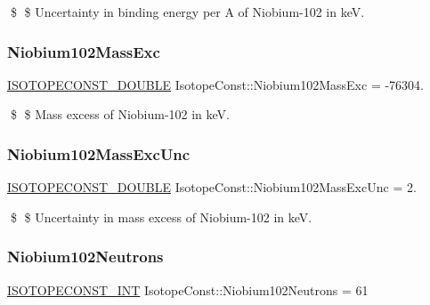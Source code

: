 \$ \$ Uncertainty in binding energy per A of Niobium-\/102 in keV. \mbox{\label{group___isotope_const-_niobium-_nb102_ga634a663657324eded202df357acde7ba}} 
\subsubsection{\texorpdfstring{Niobium102\+Mass\+Exc}{Niobium102MassExc}}
{\footnotesize\ttfamily \mbox{\hyperlink{group___isotope_const-_macros_ga8f45a7272ce02c0b4c65c44636ed719a}{I\+S\+O\+T\+O\+P\+E\+C\+O\+N\+S\+T\+\_\+\+D\+O\+U\+B\+LE}} Isotope\+Const\+::\+Niobium102\+Mass\+Exc = -\/76304.}

\$ \$ Mass excess of Niobium-\/102 in keV. \mbox{\label{group___isotope_const-_niobium-_nb102_ga6ea0af7cfe1a93e3fdfdc2a989186f41}} 
\subsubsection{\texorpdfstring{Niobium102\+Mass\+Exc\+Unc}{Niobium102MassExcUnc}}
{\footnotesize\ttfamily \mbox{\hyperlink{group___isotope_const-_macros_ga8f45a7272ce02c0b4c65c44636ed719a}{I\+S\+O\+T\+O\+P\+E\+C\+O\+N\+S\+T\+\_\+\+D\+O\+U\+B\+LE}} Isotope\+Const\+::\+Niobium102\+Mass\+Exc\+Unc = 2.}

\$ \$ Uncertainty in mass excess of Niobium-\/102 in keV. \mbox{\label{group___isotope_const-_niobium-_nb102_ga0698247eb19451fb162883dfd457841d}} 
\subsubsection{\texorpdfstring{Niobium102\+Neutrons}{Niobium102Neutrons}}
{\footnotesize\ttfamily \mbox{\hyperlink{group___isotope_const-_macros_ga5f18360b3e99483a35c32d789e62621c}{I\+S\+O\+T\+O\+P\+E\+C\+O\+N\+S\+T\+\_\+\+I\+NT}} Isotope\+Const\+::\+Niobium102\+Neutrons = 61}

